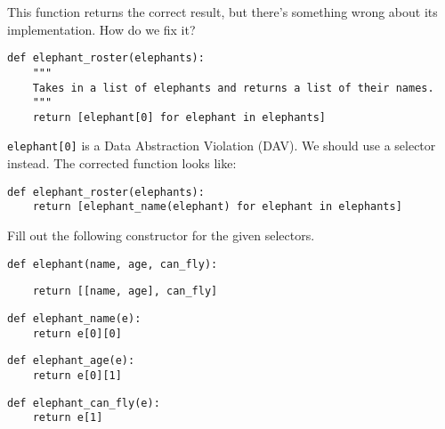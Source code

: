 
\begin{blocksection}
\question This function returns the correct result, but there's something wrong
about its implementation. How do we fix it?

\begin{lstlisting}
def elephant_roster(elephants):
    """
    Takes in a list of elephants and returns a list of their names.
    """
    return [elephant[0] for elephant in elephants]
\end{lstlisting}
\begin{solution}[1in]
\lstinline{elephant[0]} is a Data Abstraction Violation (DAV).
We should use a selector instead.
The corrected function looks like:
\begin{lstlisting}
def elephant_roster(elephants):
	return [elephant_name(elephant) for elephant in elephants]
\end{lstlisting}
\end{solution}

\end{blocksection}


\begin{blocksection}
\question Fill out the following constructor for the given selectors.

\begin{lstlisting}
def elephant(name, age, can_fly):
\end{lstlisting}
\begin{solution}[1in]
\begin{lstlisting}
    return [[name, age], can_fly]
\end{lstlisting}
\end{solution}

\begin{lstlisting}
def elephant_name(e):
    return e[0][0]
\end{lstlisting}

\begin{lstlisting}
def elephant_age(e):
    return e[0][1]
\end{lstlisting}

\begin{lstlisting}
def elephant_can_fly(e):
    return e[1]
\end{lstlisting}

\end{blocksection}


